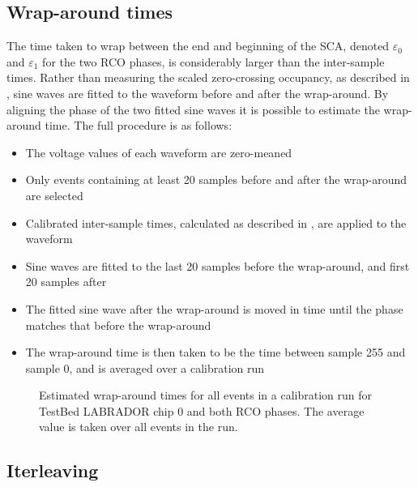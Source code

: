 \subsection{Wrap-around times}
\label{sec:calibration:LABRADOR-Digitiser-Chip:Wrap-around-times}

The time taken to wrap between the end and beginning of the SCA, denoted $\varepsilon_{0}$ and $\varepsilon_{1}$ for the two RCO phases, is considerably larger than the inter-sample times. Rather than measuring the scaled zero-crossing occupancy, as described in , sine waves are fitted to the waveform before and after the wrap-around. By aligning the phase of the two fitted sine waves it is possible to estimate the wrap-around time. The full procedure is as follows:

\begin{itemize}
\item The voltage values of each waveform are zero-meaned
\item Only events containing at least 20 samples before and after the wrap-around are selected
\item Calibrated inter-sample times, calculated as described in , are applied to the waveform 
\item Sine waves are fitted to the last 20 samples before the wrap-around, and first 20 samples after
\item The fitted sine wave after the wrap-around is moved in time until the phase matches that before the wrap-around
\item The wrap-around time is then taken to be the time between sample 255 and sample 0, and is averaged over a calibration run
\end{itemize}


\begin{figure}[htpb]
  \hfill
  \caption{Estimated wrap-around times for all events in a calibration run for TestBed LABRADOR chip 0 and both RCO phases. The average value is taken over all events in the run.}
  \label{fig:calibration:LABRADOR-Digitiser-Chip:Wrap-around}
\end{figure}


\subsection{Iterleaving}
\label{sec:calibration:LABRADOR-Digitiser-Chip:Iterleaving}

